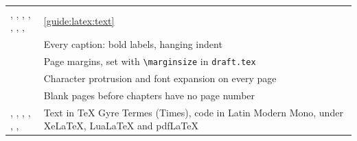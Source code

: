 \begin{xltabular}{\linewidth}{>{\ttfamily\raggedright\arraybackslash{}\hsize}X >{\raggedright\arraybackslash{}\hsize}X}
  , , , , , , ,  & \cref{guide:latex:text} \\
   & Every caption: bold labels, hanging indent \\
   & Page margins, set with \texttt{\textbackslash marginsize} in \texttt{draft.tex} \\
   & Character protrusion and font expansion on every page \\
   & Blank pages before chapters have no page number \\
  , , , , , ,  & Text in TeX Gyre Termes (Times), code in Latin Modern Mono, under XeLaTeX, LuaLaTeX and pdfLaTeX \\
  \bottomrule
\end{xltabular}

